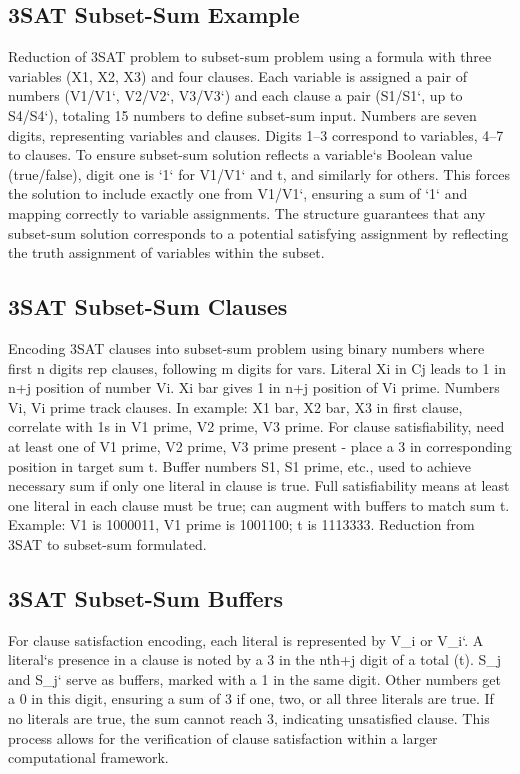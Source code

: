 \subsection*{3SAT Subset-Sum  Example}
Reduction of 3SAT problem to subset-sum problem using a formula with three variables (X1, X2, X3) and four clauses.
Each variable is assigned a pair of numbers (V1/V1`, V2/V2`, V3/V3`) and each clause a pair (S1/S1`, up to S4/S4`), totaling 15 numbers to define subset-sum input.
Numbers are seven digits, representing variables and clauses.
Digits 1--3 correspond to variables, 4--7 to clauses.
To ensure subset-sum solution reflects a variable`s Boolean value (true/false), digit one is `1` for V1/V1` and t, and similarly for others.
This forces the solution to include exactly one from V1/V1`, ensuring a sum of `1` and mapping correctly to variable assignments.
The structure guarantees that any subset-sum solution corresponds to a potential satisfying assignment by reflecting the truth assignment of variables within the subset.

\subsection*{3SAT Subset-Sum  Clauses}
Encoding 3SAT clauses into subset-sum problem using binary numbers where first n digits rep clauses, following m digits for vars.
Literal Xi in Cj leads to 1 in n+j position of number Vi.
Xi bar gives 1 in n+j position of Vi prime.
Numbers Vi, Vi prime track clauses.
In example: X1 bar, X2 bar, X3 in first clause, correlate with 1s in V1 prime, V2 prime, V3 prime.
For clause satisfiability, need at least one of V1 prime, V2 prime, V3 prime present - place a 3 in corresponding position in target sum t.
Buffer numbers S1, S1 prime, etc., used to achieve necessary sum if only one literal in clause is true.
Full satisfiability means at least one literal in each clause must be true; can augment with buffers to match sum t.
Example: V1 is 1000011, V1 prime is 1001100; t is 1113333.
Reduction from 3SAT to subset-sum formulated.

\subsection*{3SAT Subset-Sum  Buffers}
For clause satisfaction encoding, each literal is represented by V\_i or V\_i`.
A literal`s presence in a clause is noted by a 3 in the nth+j digit of a total (t).
S\_j and S\_j` serve as buffers, marked with a 1 in the same digit.
Other numbers get a 0 in this digit, ensuring a sum of 3 if one, two, or all three literals are true.
If no literals are true, the sum cannot reach 3, indicating unsatisfied clause.
This process allows for the verification of clause satisfaction within a larger computational framework.

